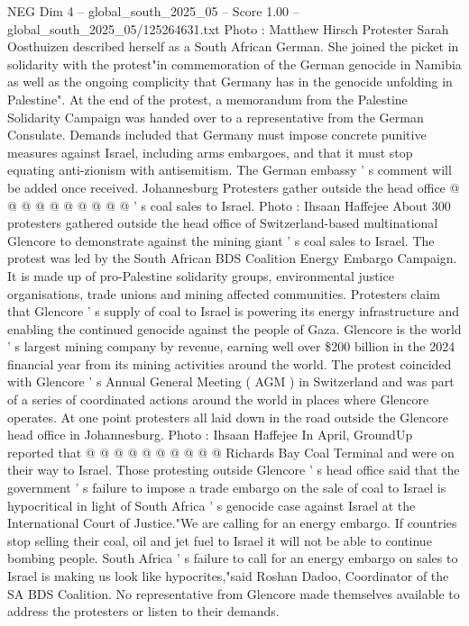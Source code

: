 \begin{textsample}{NEG Dim 4 – global\_south\_2025\_05 – Score 1.00 – global\_south\_2025\_05/125264631.txt}
Photo : Matthew Hirsch Protester Sarah Oosthuizen described herself as a South African German.
She joined the picket in solidarity with the protest"in commemoration of the German genocide in Namibia as well as the ongoing complicity that Germany has in the genocide unfolding in Palestine".
At the end of the protest, a memorandum from the Palestine Solidarity Campaign was handed over to a representative from the German Consulate.
Demands included that Germany must impose concrete punitive measures against Israel, including arms embargoes, and that it must stop equating anti-zionism with antisemitism.
The German embassy ' s comment will be added once received.
Johannesburg Protesters gather outside the head office @ @ @ @ @ @ @ @ @ @ ' s coal sales to Israel.
Photo : Ihsaan Haffejee About 300 protesters gathered outside the head office of Switzerland-based multinational Glencore to demonstrate against the mining giant ' s coal sales to Israel.
The protest was led by the South African BDS Coalition Energy Embargo Campaign.
It is made up of pro-Palestine solidarity groups, environmental justice organisations, trade unions and mining affected communities.
Protesters claim that Glencore ' s supply of coal to Israel is powering its energy infrastructure and enabling the continued genocide against the people of Gaza.
Glencore is the world ' s largest mining company by revenue, earning well over \$200 billion in the 2024 financial year from its mining activities around the world.
The protest coincided with Glencore ' s Annual General Meeting ( AGM ) in Switzerland and was part of a series of coordinated actions around the world in places where Glencore operates.
At one point protesters all laid down in the road outside the Glencore head office in Johannesburg.
Photo : Ihsaan Haffejee In April, GroundUp reported that @ @ @ @ @ @ @ @ @ @ Richards Bay Coal Terminal and were on their way to Israel.
Those protesting outside Glencore ' s head office said that the government ' s failure to impose a trade embargo on the sale of coal to Israel is hypocritical in light of South Africa ' s genocide case against Israel at the International Court of Justice."We are calling for an energy embargo.
If countries stop selling their coal, oil and jet fuel to Israel it will not be able to continue bombing people.
South Africa ' s failure to call for an energy embargo on sales to Israel is making us look like hypocrites,"said Roshan Dadoo, Coordinator of the SA BDS Coalition.
No representative from Glencore made themselves available to address the protesters or listen to their demands.

\end{textsample}
